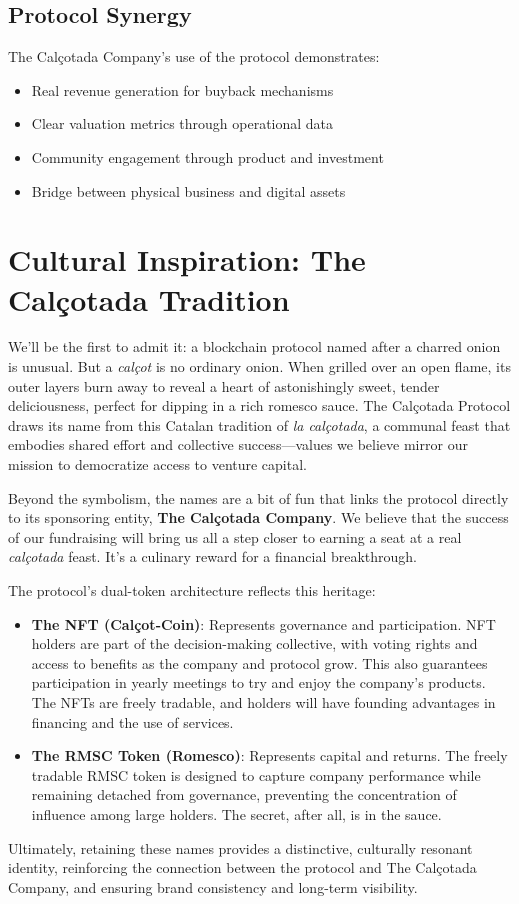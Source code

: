 \documentclass[conference]{IEEEtran}
\begin{document}
\subsection{Protocol Synergy}

The Calçotada Company's use of the protocol demonstrates:
\begin{itemize}
    \item Real revenue generation for buyback mechanisms
    \item Clear valuation metrics through operational data
    \item Community engagement through product and investment
    \item Bridge between physical business and digital assets
\end{itemize}

\section{Cultural Inspiration: The Calçotada Tradition}

We'll be the first to admit it: a blockchain protocol named after a charred onion is unusual. But a \textit{calçot} is no ordinary onion. When grilled over an open flame, its outer layers burn away to reveal a heart of astonishingly sweet, tender deliciousness, perfect for dipping in a rich romesco sauce. The Calçotada Protocol draws its name from this Catalan tradition of \textit{la calçotada}, a communal feast that embodies shared effort and collective success—values we believe mirror our mission to democratize access to venture capital.

Beyond the symbolism, the names are a bit of fun that links the protocol directly to its sponsoring entity, \textbf{The Calçotada Company}. We believe that the success of our fundraising will bring us all a step closer to earning a seat at a real \textit{calçotada} feast. It's a culinary reward for a financial breakthrough.

The protocol's dual-token architecture reflects this heritage:
\begin{itemize}
    \item \textbf{The NFT (Calçot-Coin)}: Represents governance and participation. NFT holders are part of the decision-making collective, with voting rights and access to benefits as the company and protocol grow. This also guarantees participation in yearly meetings to try and enjoy the company’s products. The NFTs are freely tradable, and holders will have founding advantages in financing and the use of services.
    \item \textbf{The RMSC Token (Romesco)}: Represents capital and returns. The freely tradable RMSC token is designed to capture company performance while remaining detached from governance, preventing the concentration of influence among large holders. The secret, after all, is in the sauce.
\end{itemize}

Ultimately, retaining these names provides a distinctive, culturally resonant identity, reinforcing the connection between the protocol and The Calçotada Company, and ensuring brand consistency and long-term visibility.


\end{document}
